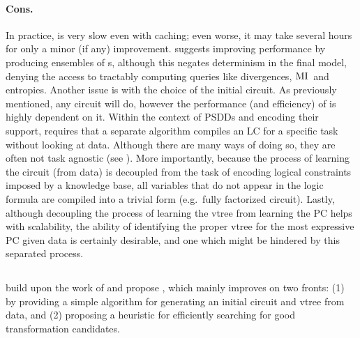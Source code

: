 \paragraph{Cons.} In practice,  is very slow even with caching; even worse, it
may take several hours for only a minor (if any) improvement. \citep{liang17} suggests improving
performance by producing ensembles of s, although this negates determinism in
the final model, denying the access to tractably computing queries like divergences, $\operatorname{\normalfont{MI}}{}$
and entropies. Another issue is with the choice of the initial circuit. As previously mentioned,
any circuit will do, however the performance (and efficiency) of  is highly
dependent on it. Within the context of PSDDs and encoding their support, 
requires that a separate algorithm compiles an LC for a specific task without looking at data.
Although there are many ways of doing so, they are often not task agnostic (see ).
More importantly, because the process of learning the circuit (from data) is decoupled from the
task of encoding logical constraints imposed by a knowledge base, all variables that do not appear
in the logic formula are compiled into a trivial form (e.g.\ fully factorized circuit). Lastly,
although decoupling the process of learning the vtree from learning the PC helps with scalability,
the ability of identifying the proper vtree for the most expressive PC given data is certainly
desirable, and one which might be hindered by this separated process.

\subsection{}

\citep{dang20} build upon the work of  and propose , which
mainly improves  on two fronts: (1) by providing a simple algorithm for
generating an initial circuit and vtree from data, and (2) proposing a heuristic for efficiently
searching for good transformation candidates.

